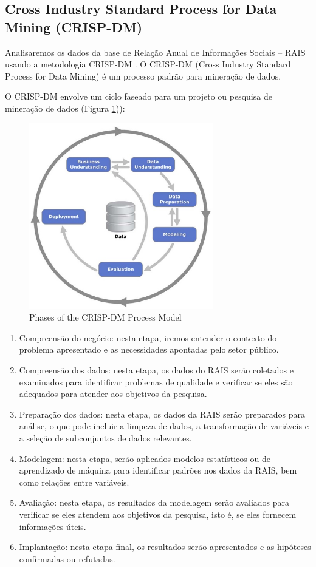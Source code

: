 \subsection{Cross Industry Standard Process for Data Mining (CRISP-DM)}

Analisaremos os dados da base de Relação Anual de Informações Sociais – RAIS usando a metodologia CRISP-DM \cite{chapman2000crisp}. O CRISP-DM (Cross Industry Standard Process for Data Mining) é um processo padrão para mineração de dados.

O CRISP-DM envolve um ciclo faseado para um projeto ou pesquisa de mineração de dados (Figura \ref{fig1})):

\begin{figure}[htbp]
	\centerline{
		\includegraphics[width=80mm,scale=0.8]{assets/crispdm.jpg}
	}
	\caption{Phases of the CRISP-DM Process Model}
	\label{fig1}
\end{figure}

\begin{enumerate}
	\item Compreensão do negócio: nesta etapa, iremos entender o contexto do problema apresentado e as necessidades apontadas pelo setor público.
	\item Compreensão dos dados: nesta etapa, os dados do RAIS serão coletados e examinados para identificar problemas de qualidade e verificar se eles são adequados para atender aos objetivos da pesquisa.
	\item Preparação dos dados: nesta etapa, os dados da RAIS serão preparados para análise, o que pode incluir a limpeza de dados, a transformação de variáveis e a seleção de subconjuntos de dados relevantes. 
	\item Modelagem: nesta etapa, serão aplicados modelos estatísticos ou de aprendizado de máquina para identificar padrões nos dados da RAIS, bem como relações entre variáveis.
	\item Avaliação: nesta etapa, os resultados da modelagem serão avaliados para verificar se eles atendem aos objetivos da pesquisa, isto é, se eles fornecem informações úteis.
	\item Implantação: nesta etapa final, os resultados serão apresentados e as hipóteses confirmadas ou refutadas.     	      	      	      	      	      
\end{enumerate}
